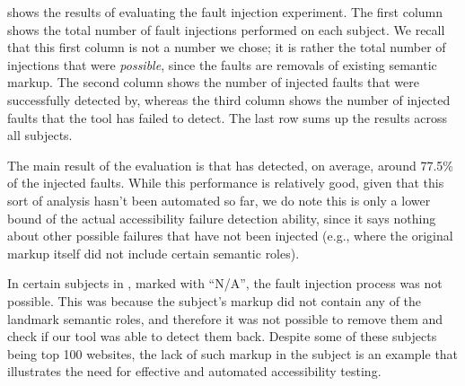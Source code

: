 \label{subsec:rq2-results}
 shows the results of evaluating the fault 
injection experiment. 
The first column shows the total number of fault injections performed on 
each subject. 
We recall that this first column is not a number we chose; 
it is rather the total number of injections that were \emph{possible}, 
since the faults are removals of existing semantic markup. 
The second column shows the number of injected faults that 
were successfully detected by, whereas the third column shows the 
number of injected faults that the tool has failed to detect. 
The last row sums up the results across all subjects.

The main result of the evaluation is that \toolname has detected, 
on average, around 77.5\% of the injected faults. 
While this performance is relatively good, 
given that this sort of analysis hasn't been automated so far, 
we do note this is only a lower bound of the actual accessibility 
failure detection ability, since it says nothing about other possible 
failures that have not been injected 
(e.g., where the original markup itself did not include certain semantic roles). 

In certain subjects in , marked with ``N/A'', the fault 
injection process was not possible. 
This was because the subject's markup did not contain any of the landmark semantic roles, 
and therefore it was not possible to remove them and check if our tool 
was able to detect them back. 
Despite some of these subjects being top 100 websites, 
the lack of such markup in the subject is an example that illustrates the need for effective 
and automated accessibility testing.

